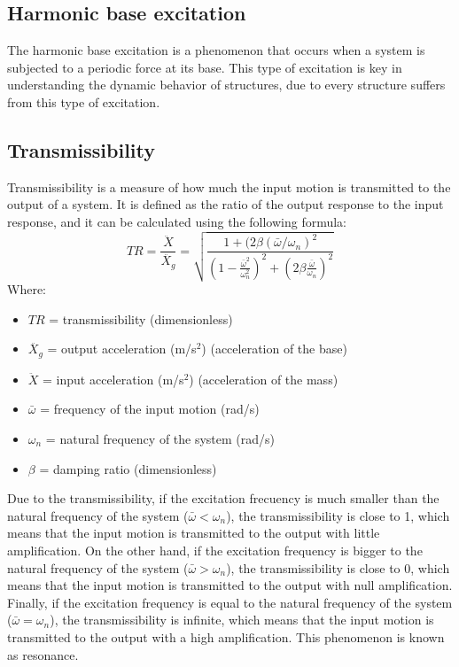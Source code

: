 \documentclass{article}  %
\begin{document}
\subsection{Harmonic base excitation}
The harmonic base excitation is a phenomenon that occurs when a system is subjected to a periodic force at its base. This type of excitation is key in understanding the dynamic behavior of structures, due to every structure suffers from this type of excitation. 

\subsection{Transmissibility}
Transmissibility is a measure of how much the input motion is transmitted to the output of a system. It is defined as the ratio of the output response to the input response, and it can be calculated using the following formula:
\begin{equation}
TR = \frac{\ddot{X}}{\ddot{X_g}} = \sqrt{\frac{1+(2 \beta (\bar{\omega}/\omega_n)^2}{(1 - \frac{\bar{\omega}^2}{\omega_n^2})^2 + (2\beta\frac{\bar{\omega}}{\omega_n})^2}} 
\label{eq:transmissibility}
\end{equation}
Where:
\begin{itemize}
  \item $TR$ = transmissibility (dimensionless)
  \item $\ddot{X_g}$ = output acceleration (m/s$^2$) (acceleration of the base) 
  \item $\ddot{X}$ = input acceleration (m/s$^2$) (acceleration of the mass)
  \item $\bar{\omega}$ = frequency of the input motion (rad/s)
  \item $\omega_n$ = natural frequency of the system (rad/s)
  \item $\beta$ = damping ratio (dimensionless)
\end{itemize}

Due to the transmissibility, if the excitation frecuency is much smaller than the natural frequency of the system ($\bar{\omega} < \omega_n$), the transmissibility is close to 1, which means that the input motion is transmitted to the output with little amplification. On the other hand, if the excitation frequency is bigger to the natural frequency of the system ($\bar{\omega} > \omega_n$), the transmissibility is close to 0, which means that the input motion is transmitted to the output with null amplification. Finally, if the excitation frequency is equal to the natural frequency of the system ($\bar{\omega} = \omega_n$), the transmissibility is infinite, which means that the input motion is transmitted to the output with a high amplification. This phenomenon is known as resonance.
\end{document}
